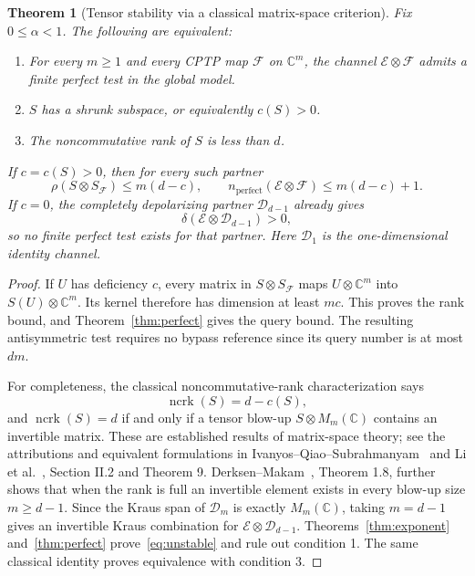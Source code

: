 \documentclass[11pt,a4paper]{article}
\newtheorem{theorem}{Theorem}[section]
\theoremstyle{remark}\newtheorem{remark}[theorem]{Remark}
\newcommand{\E}{\mathcal E}
\newcommand{\CC}{\mathbb C}
\begin{document}
\begin{theorem}[Tensor stability via a classical matrix-space criterion]\label{thm:stable}
Fix $0\le\alpha<1$. The following are equivalent:
\begin{enumerate}
\item For every $m\ge1$ and every CPTP map $\mathcal F$ on $\CC^m$, the channel $\E\otimes\mathcal F$ admits a finite perfect test in the global model.
\item $S$ has a shrunk subspace, or equivalently $c(S)>0$.
\item The noncommutative rank of $S$ is less than $d$.
\end{enumerate}
If $c=c(S)>0$, then for every such partner
\begin{equation}
\rho(S\otimes S_{\mathcal F})\le m(d-c),\qquad
n_{\mathrm{perfect}}(\E\otimes\mathcal F)\le m(d-c)+1.
\label{eq:stable-bound}
\end{equation}
If $c=0$, the completely depolarizing partner $\mathcal D_{d-1}$ already gives
\begin{equation}
\delta(\E\otimes\mathcal D_{d-1})>0,
\label{eq:unstable}
\end{equation}
so no finite perfect test exists for that partner. Here $\mathcal D_1$ is the one-dimensional identity channel.
\end{theorem}
\begin{proof}
If $U$ has deficiency $c$, every matrix in $S\otimes S_{\mathcal F}$ maps $U\otimes\CC^m$ into $S(U)\otimes\CC^m$. Its kernel therefore has dimension at least $mc$. This proves the rank bound, and Theorem~\ref{thm:perfect} gives the query bound. The resulting antisymmetric test requires no bypass reference since its query number is at most $dm$.

For completeness, the classical noncommutative-rank characterization says
\[
\operatorname{ncrk}(S)=d-c(S),
\]
and $\operatorname{ncrk}(S)=d$ if and only if a tensor blow-up $S\otimes M_m(\CC)$ contains an invertible matrix. These are established results of matrix-space theory; see the attributions and equivalent formulations in Ivanyos--Qiao--Subrahmanyam~\cite{iqs} and Li et al.~\cite{li}, Section II.2 and Theorem 9. Derksen--Makam~\cite{degree}, Theorem 1.8, further shows that when the rank is full an invertible element exists in every blow-up size $m\ge d-1$. Since the Kraus span of $\mathcal D_m$ is exactly $M_m(\CC)$, taking $m=d-1$ gives an invertible Kraus combination for $\E\otimes\mathcal D_{d-1}$. Theorems~\ref{thm:exponent} and~\ref{thm:perfect} prove~\eqref{eq:unstable} and rule out condition 1. The same classical identity proves equivalence with condition 3.
\end{proof}
\end{document}
